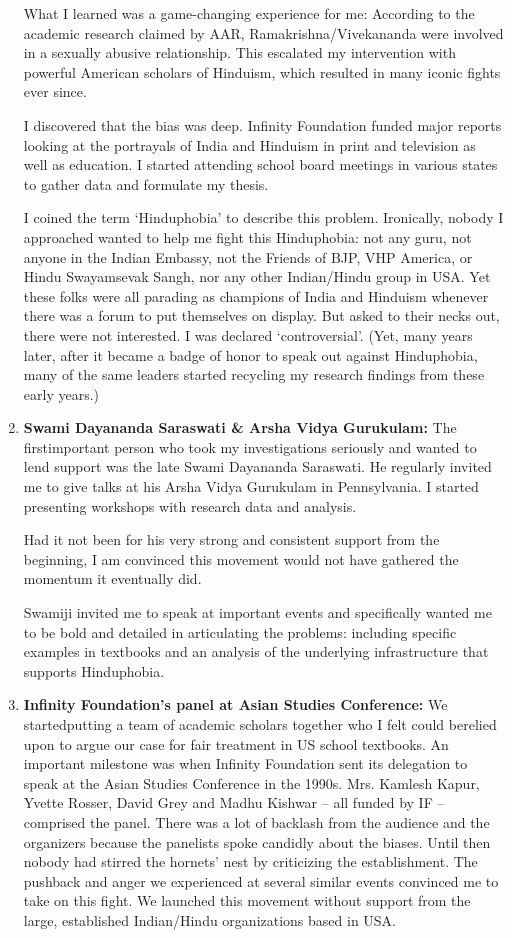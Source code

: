 \begin{enumerate}
What I learned was a game-changing experience for me: According to the academic research claimed by AAR, Ramakrishna/Vivekananda were involved in a sexually abusive relationship. This escalated my intervention with powerful American scholars of Hinduism, which resulted in many iconic fights ever since.

I discovered that the bias was deep. Infinity Foundation funded major reports looking at the portrayals of India and Hinduism in print and television as well as education. I started attending school board meetings in various states to gather data and formulate my thesis.

I coined the term ‘Hinduphobia’ to describe this problem. Ironically, nobody I approached wanted to help me fight this Hinduphobia: not any guru, not anyone in the Indian Embassy, not the Friends of BJP, VHP America, or Hindu Swayamsevak Sangh, nor any other Indian/Hindu group in USA. Yet these folks were all parading as champions of India and Hinduism whenever there was a forum to put themselves on display. But asked to their necks out, there were not interested. I was declared ‘controversial’. (Yet, many years later, after it became a badge of honor to speak out against Hinduphobia, many of the same leaders started recycling my research findings from these early years.)

\item \textbf{Swami Dayananda Saraswati \& Arsha Vidya Gurukulam:} The first\break important person who took my investigations seriously and wanted to lend support was the late Swami Dayananda Saraswati. He regularly invited me to give talks at his Arsha Vidya Gurukulam in Pennsylvania. I started presenting workshops with research data and analysis.

Had it not been for his very strong and consistent support from the beginning, I am convinced this movement would not have gathered the momentum it eventually did.

Swamiji invited me to speak at important events and specifically wanted me to be bold and detailed in articulating the problems: including specific examples in textbooks and an analysis of the underlying infrastructure that supports Hinduphobia.

\item \textbf{Infinity Foundation’s panel at Asian Studies Conference:} We started\break putting a team of academic scholars together who I felt could be\break relied upon to argue our case for fair treatment in US school textbooks. An important milestone was when Infinity Foundation sent its delegation to speak at the Asian Studies Conference in the 1990s. Mrs. Kamlesh Kapur, Yvette Rosser, David Grey and Madhu Kishwar – all funded by IF – comprised the panel. There was a lot of backlash from the audience and the organizers because the panelists spoke candidly about the biases. Until then nobody had stirred the hornets’ nest by criticizing the establishment. The pushback and anger we experienced at several similar events convinced me to take on this fight. We launched this movement without support from the large, established Indian/Hindu organizations based in USA.


\end{enumerate}
